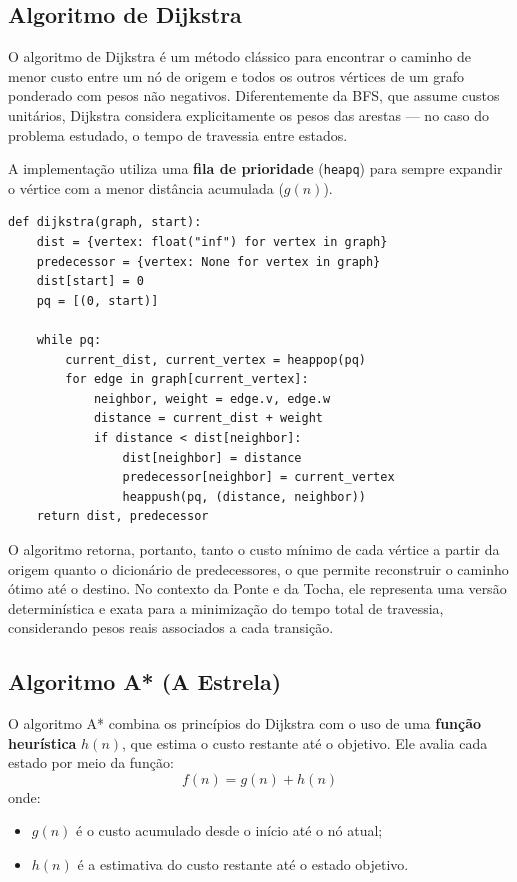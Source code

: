 \documentclass[12pt,a4paper]{article}
\begin{document}
\subsection{Algoritmo de Dijkstra}
O algoritmo de Dijkstra é um método clássico para encontrar o caminho de menor custo entre um nó de origem e todos os outros vértices de um grafo ponderado com pesos não negativos. 
Diferentemente da BFS, que assume custos unitários, Dijkstra considera explicitamente os pesos das arestas --- no caso do problema estudado, o tempo de travessia entre estados.

A implementação utiliza uma \textbf{fila de prioridade} (\texttt{heapq}) para sempre expandir o vértice com a menor distância acumulada (\( g(n) \)).

\begin{lstlisting}[caption={Trecho da função Dijkstra.}]
def dijkstra(graph, start):
    dist = {vertex: float("inf") for vertex in graph}
    predecessor = {vertex: None for vertex in graph}
    dist[start] = 0
    pq = [(0, start)]

    while pq:
        current_dist, current_vertex = heappop(pq)
        for edge in graph[current_vertex]:
            neighbor, weight = edge.v, edge.w
            distance = current_dist + weight
            if distance < dist[neighbor]:
                dist[neighbor] = distance
                predecessor[neighbor] = current_vertex
                heappush(pq, (distance, neighbor))
    return dist, predecessor
\end{lstlisting}

O algoritmo retorna, portanto, tanto o custo mínimo de cada vértice a partir da origem quanto o dicionário de predecessores, o que permite reconstruir o caminho ótimo até o destino. 
No contexto da Ponte e da Tocha, ele representa uma versão determinística e exata para a minimização do tempo total de travessia, considerando pesos reais associados a cada transição.

\subsection{Algoritmo A* (A Estrela)}
O algoritmo A* combina os princípios do Dijkstra com o uso de uma \textbf{função heurística} \( h(n) \), que estima o custo restante até o objetivo. 
Ele avalia cada estado por meio da função:
\[
f(n) = g(n) + h(n)
\]
onde:
\begin{itemize}
    \item \( g(n) \) é o custo acumulado desde o início até o nó atual;
    \item \( h(n) \) é a estimativa do custo restante até o estado objetivo.
\end{itemize}
\end{document}
